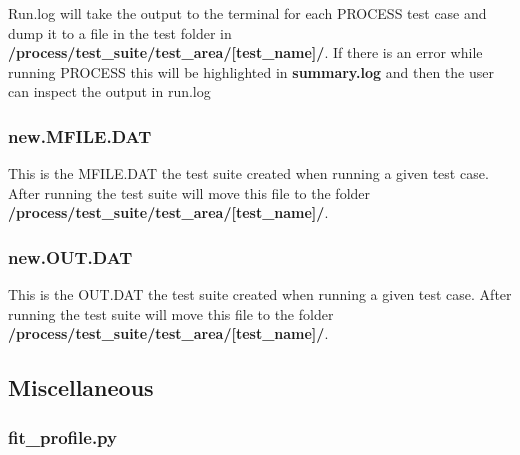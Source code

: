 \documentclass[11pt,a4paper]{article}
\begin{document}
Run.log will take the output to the terminal for each PROCESS test case and dump it to a 
file in the test folder in \textbf{/process/test\_suite/test\_area/[test\_name]/}. If 
there is an error while running PROCESS this will be highlighted in \textbf{summary.log} 
and then the user can inspect the output in run.log\\

\subsubsection*{new.MFILE.DAT}

This is the MFILE.DAT the test suite created when running a given test case. After running 
the test suite will move this file to the folder 
\textbf{/process/test\_suite/test\_area/[test\_name]/}.\\

\subsubsection*{new.OUT.DAT}

This is the OUT.DAT the test suite created when running a given test case. After running 
the test suite will move this file to the folder 
\textbf{/process/test\_suite/test\_area/[test\_name]/}.\\


\subsection{Miscellaneous}

\subsubsection{fit\_profile.py}
\end{document}
